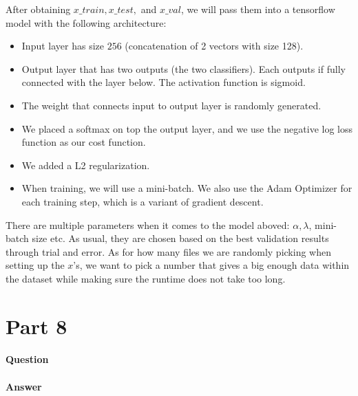 \documentclass[11pt,twoside]{article}
\begin{document}
After obtaining $x\_train, x\_test,$ and $x\_val$, we will pass them into a tensorflow model with the following architecture:
\begin {itemize}
	\item Input layer has size $256$ (concatenation of 2 vectors with size 128).
	\item Output layer that has two outputs (the two classifiers). Each outputs if fully connected with the layer below. The activation function is sigmoid.
	\item The weight that connects input to output layer is randomly generated.
	\item We placed a softmax on top the output layer, and we use the negative log loss function as our cost function.
	\item We added a L2 regularization.
	\item When training, we will use a mini-batch. We also use the Adam Optimizer for each training step, which is a variant of gradient descent.
\end {itemize}

There are multiple parameters when it comes to the model aboved: $\alpha, \lambda$, mini-batch size etc. As usual, they are chosen based on the best validation results through trial and error. As for how many files we are randomly picking when setting up the $x$'s, we want to pick a number that gives a big enough data within the dataset while making sure the runtime does not take too long. 

\clearpage

\section*{Part 8}
\paragraph{Question}


\paragraph{Answer}


\clearpage
\end{document}
